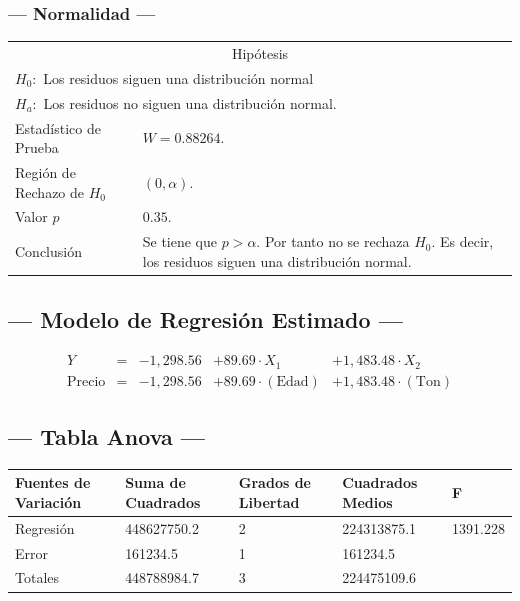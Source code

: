\subsubsection{--- Normalidad ---} %
\begin{center}
  \begin{tabular}{|l|p{8cm}|}
    \cline{1-2}
    \multicolumn{2}{|c|}{Hipótesis}\\ \cline{1-2}
    \multicolumn{2}{|l|}{\(H_0:\) Los residuos siguen una distribución normal} \\ 
    \multicolumn{2}{|l|}{\(H_a:\) Los residuos no siguen una distribución normal.} \\ \cline{1-2}
    Estadístico de Prueba & \(W = 0.88264\).\\ \cline{1-2} 
		Región de Rechazo de \(H_0\) & \((0, \alpha )\).\\ \cline{1-2} 
    Valor \(p\) & \(0.35\).\\ \cline{1-2} 
    Conclusión & Se tiene que \(p> \alpha\). \newline 
		Por tanto no se rechaza \(H_0\). \newline 
		Es decir, los residuos siguen una distribución normal.\\ \cline{1-2} 
  \end{tabular}
\end{center}


\subsection{\centering --- Modelo de Regresión Estimado ---} %
\begin{align}
	Y & = &              -1,298.56 & + 89.69 \cdot X_1           & + 1,483.48   \cdot X_2   \\[2mm]
	\mbox{Precio} & = &  -1,298.56 & + 89.69 \cdot (\mbox{Edad}) & + 1,483.48   \cdot (\mbox{Ton})
	\label{eq:2}
\end{align}

\subsection{\centering --- Tabla Anova ---} %
\begin{center}
  \begin{tabular}{|l|l|l|l|l|}
    \hline 
    Fuentes de Variación  & Suma de Cuadrados & Grados de Libertad & Cuadrados Medios & F\\ \hline 
Regresión  &  448627750.2         &  2     & 224313875.1 &1391.228 \\ \hline
Error      &     161234.5         &  1     &    161234.5 &  \\ \hline
Totales    &  448788984.7         &  3     & 224475109.6 &  \\ \hline
  \end{tabular}
\end{center} 

